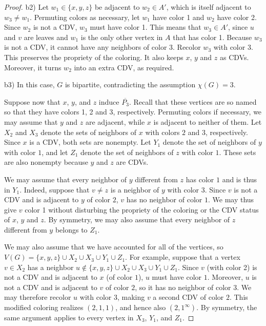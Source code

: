 \documentclass[10pt,a4paper]{amsart}
\begin{document}
\begin{proof}
b2)
Let $w_1\in\{x,y,z\}$ be adjacent to $w_2\in A'$, which is itself adjacent to $w_3\neq w_1$.
Permuting colors as necessary, let $w_1$ have color 1 and $w_2$ have color 2.
Since $w_2$ is not a CDV, $w_3$ must have color 1.
This means that $w_3\in A'$, since $u$ and $v$ are leaves and $w_1$ is the only other vertex in $A$ that has color 1.
Because $w_3$ is not a CDV, it cannot have any neighbors of color 3.
Recolor $w_3$ with color 3.
This preserves the propriety of the coloring.
It also keeps $x$, $y$ and $z$ as CDVs.
Moreover, it turns $w_2$ into an extra CDV, as required.

b3)
In this case, $G$ is bipartite, contradicting the assumption $\chi(G)=3$.

\smallskip

Suppose now that $x$, $y$, and $z$ induce $\overline{P_3}$.
Recall that these vertices are so named so that they have colors 1, 2 and 3, respectively.
Permuting colors if necessary, we may assume that $y$ and $z$ are adjacent, while $x$ is adjacent to neither of them.
Let $X_2$ and $X_3$ denote the sets of neighbors of $x$ with colors $2$ and $3$, respectively. Since $x$ is a CDV, both sets are nonempty. Let $Y_1$ denote the set of neighbors of $y$ with color $1$, and let $Z_1$ denote the set of neighbors of $z$ with color $1$. These sets are also nonempty because $y$ and $z$ are CDVs. 

We may assume that every neighbor of $y$ different from $z$ has color $1$ and is thus in $Y_1$.
Indeed, suppose that $v\neq z$ is a neighbor of $y$ with color $3$.
Since $v$ is not a CDV and is adjacent to $y$ of color $2$, $v$ has no neighbor of color $1$.
We may thus give $v$ color 1 without disturbing the propriety of the coloring or the CDV status of $x$, $y$ and $z$.
By symmetry, we may also assume that every neighbor of $z$ different from $y$ belongs to $Z_1$.

We may also assume that we have accounted for all of the vertices, so $V(G)=\{x,y,z\}\cup X_2\cup X_3\cup Y_1\cup Z_1$.
For example, suppose that a vertex $v\in X_2$ has a neighbor $u\notin \{x,y,z\}\cup X_2\cup X_3\cup Y_1\cup Z_1$. 
Since $v$ (with color 2) is not a CDV and is adjacent to $x$ (of color $1$), $u$ must have color $1$.
Moreover, $u$ is not a CDV and is adjacent to $v$ of color $2$, so it has no neighbor of color $3$. We may therefore recolor $u$ with color $3$, making $v$ a second CDV of color $2$. 
This modified coloring realizes $(2,1,1)$, and hence also $(2,1^\infty)$.
By symmetry, the same argument applies to every vertex in $X_3$, $Y_1$, and $Z_1$.


\end{proof}
\end{document}
